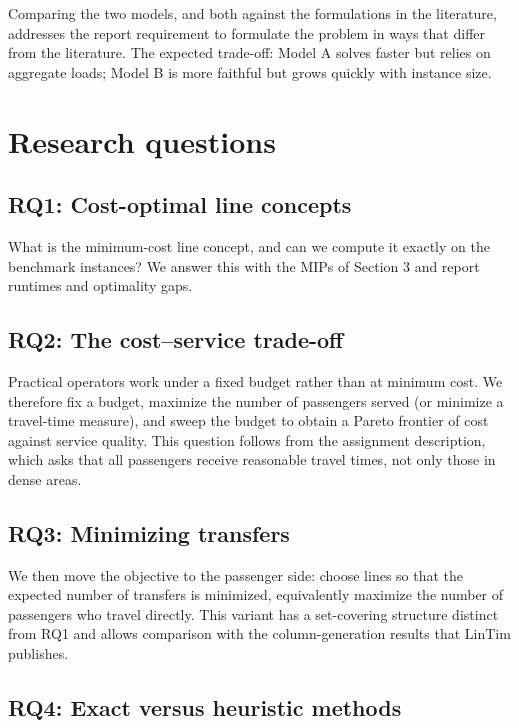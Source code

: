 \documentclass[11pt]{article}
\begin{document}
Comparing the two models, and both against the formulations in the literature, addresses the report requirement to formulate the problem in ways that differ from the literature. The expected trade-off: Model A solves faster but relies on aggregate loads; Model B is more faithful but grows quickly with instance size.

\section{Research questions}

\subsection*{RQ1: Cost-optimal line concepts}

What is the minimum-cost line concept, and can we compute it exactly on the benchmark instances? We answer this with the MIPs of Section 3 and report runtimes and optimality gaps.

\subsection*{RQ2: The cost--service trade-off}

Practical operators work under a fixed budget rather than at minimum cost. We therefore fix a budget, maximize the number of passengers served (or minimize a travel-time measure), and sweep the budget to obtain a Pareto frontier of cost against service quality. This question follows from the assignment description, which asks that all passengers receive reasonable travel times, not only those in dense areas.

\subsection*{RQ3: Minimizing transfers}

We then move the objective to the passenger side: choose lines so that the expected number of transfers is minimized, equivalently maximize the number of passengers who travel directly. This variant has a set-covering structure distinct from RQ1 and allows comparison with the column-generation results that LinTim publishes.

\subsection*{RQ4: Exact versus heuristic methods}
\end{document}

